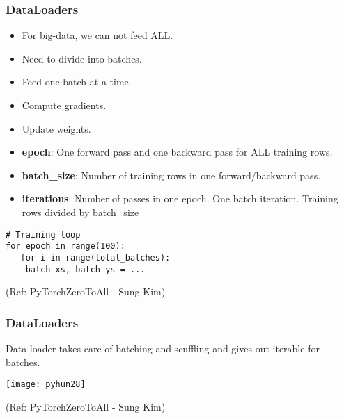 



\begin{frame}[fragile] \frametitle{DataLoaders}
\begin{itemize}
\item For big-data, we can not feed ALL. 
\item Need to divide into batches. 
\item Feed one batch at a time. 
\item Compute gradients.
\item Update weights.
\item \textbf{epoch}: One forward pass and one backward pass for ALL training rows.
\item \textbf{batch\_size}: Number of training rows in one forward/backward pass.
\item \textbf{iterations}: Number of passes in one epoch. One batch iteration. Training rows divided by batch\_size
\end{itemize}
\begin{lstlisting}
# Training loop
for epoch in range(100):
   for i in range(total_batches):
   	batch_xs, batch_ys = ...
\end{lstlisting}

\tiny{(Ref: PyTorchZeroToAll  - Sung Kim)}
\end{frame}

\begin{frame}[fragile] \frametitle{DataLoaders}
Data loader takes care of batching and scuffling and gives out iterable for batches.
\begin{center}
\texttt{[image: pyhun28]}
\end{center}

\tiny{(Ref: PyTorchZeroToAll  - Sung Kim)}
\end{frame}

